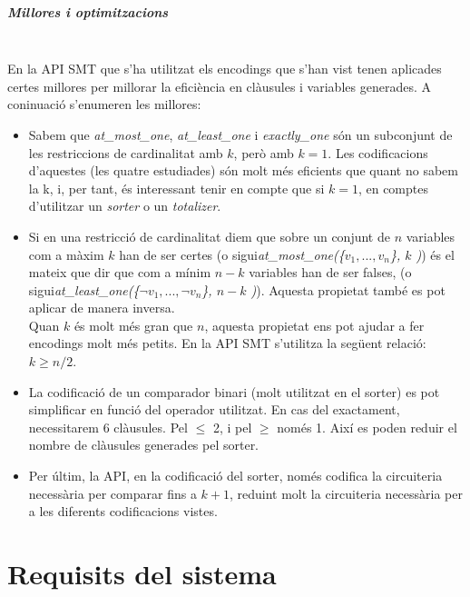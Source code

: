 \documentclass[11pt,a4paper,twoside]{report}
\begin{document}
  \paragraph*{Millores i optimitzacions} ~\\
  En la API SMT que s'ha utilitzat els encodings que s'han vist tenen aplicades certes millores per millorar la eficiència en clàusules i variables generades. A coninuació s'enumeren les millores:

  \begin{itemize}
    \item Sabem que \textit{at\_most\_one}, \textit{at\_least\_one} i \textit{exactly\_one} són
          un subconjunt de les restriccions de cardinalitat amb $k$, però amb $k=1$. Les codificacions d'aquestes (les quatre estudiades) són molt més eficients que quant no sabem la k, i, 
          per tant, és interessant tenir en compte que si $k=1$, en comptes d'utilitzar un \textit{sorter} o un \textit{totalizer}.
    \item Si en una restricció de cardinalitat diem que sobre un conjunt de $n$
          variables com a màxim $k$ han de ser certes (o sigui\textit{at\_most\_one(\{$v_1, ... ,v_n$\}, $k$ )})
          és el mateix que dir que com a mínim $n-k$ variables han de ser falses,
          (o sigui\textit{at\_least\_one(\{$\neg v_1, ... ,\neg v_n$\}, $n-k$ )}). Aquesta propietat també es pot aplicar de manera inversa. \\
          Quan $k$ és molt més gran que $n$, aquesta propietat ens pot ajudar a fer encodings molt més petits. 
          En la API SMT s'utilitza la següent relació: $k \geq n/2$.
    \item La codificació de un comparador binari (molt utilitzat en el sorter) es pot simplificar en funció del operador utilitzat. 
    En cas del exactament, necessitarem 6 clàusules. 
    Pel $\leq$ 2, i pel $\geq$ només 1. Així es poden reduir el nombre de clàusules generades pel sorter.

    \item Per últim, la API, en la codificació del sorter, només codifica la circuiteria necessària per comparar fins a $k+1$, 
    reduint molt la circuiteria necessària per a les diferents codificacions vistes.
  \end{itemize}




  \chapter{Requisits del sistema}
\end{document}
